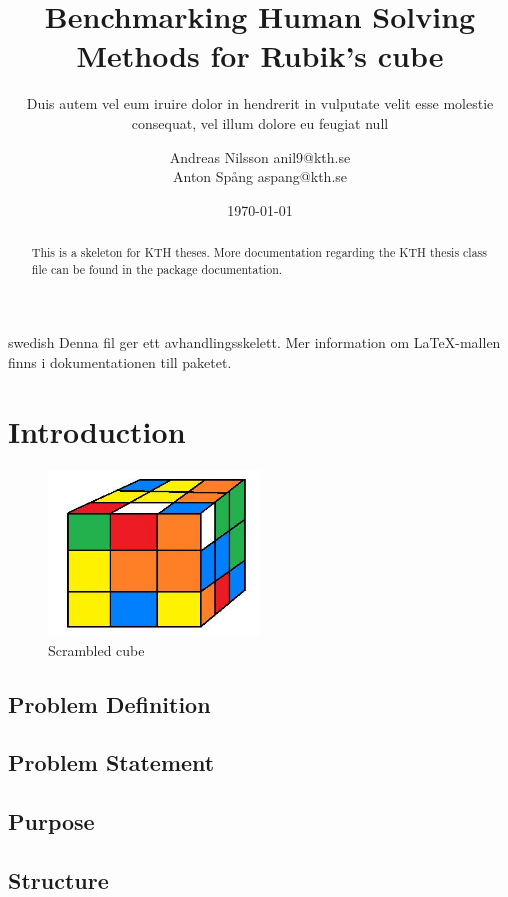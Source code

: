 \documentclass[a4paper,11pt]{kth-mag}
\title{Benchmarking Human Solving Methods for
           Rubik's cube}
\subtitle{Duis autem vel eum iruire dolor in hendrerit in
          vulputate velit esse molestie consequat, vel illum
          dolore eu feugiat null}
\author{Andreas Nilsson  anil9@kth.se\\Anton Spång  aspang@kth.se}
\date{\today}
\begin{document}
\frontmatter
\pagestyle{empty}
\removepagenumbers
\maketitle
{}
\begin{abstract}
  This is a skeleton for KTH theses. More documentation
  regarding the KTH thesis class file can be found in
  the package documentation.


\end{abstract}
\clearpage
\begin{foreignabstract}{swedish}
  Denna fil ger ett avhandlingsskelett.
  Mer information om \LaTeX-mallen finns i
  dokumentationen till paketet.


\end{foreignabstract}
\clearpage
\tableofcontents*
\mainmatter
\pagestyle{newchap}
\chapter{Introduction}
\begin{figure}[b!]
	
	\includegraphics[width=0.5\textwidth]{scramble.jpg}
	\caption{Scrambled cube}
\end{figure}
\section{Problem Definition}
\section{Problem Statement}
\section{Purpose}
\section{Structure}
\end{document}
